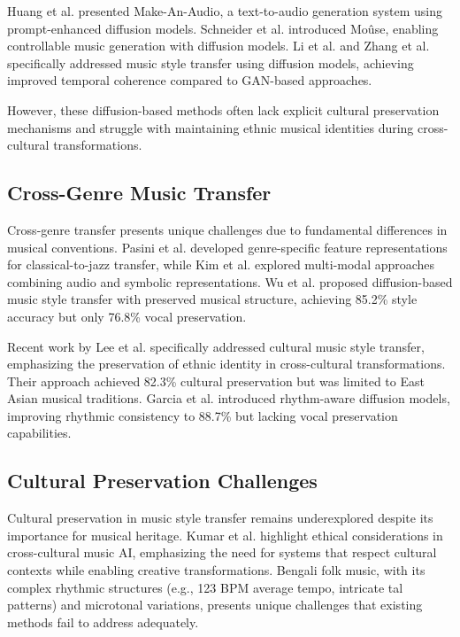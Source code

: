 \documentclass[conference]{IEEEtran}
\begin{document}
Huang et al. \cite{huang2023} presented Make-An-Audio, a text-to-audio generation system using prompt-enhanced diffusion models. Schneider et al. \cite{schneider2023} introduced Mo\^{u}se, enabling controllable music generation with diffusion models. Li et al. \cite{li2023} and Zhang et al. \cite{zhang2023} specifically addressed music style transfer using diffusion models, achieving improved temporal coherence compared to GAN-based approaches.

However, these diffusion-based methods often lack explicit cultural preservation mechanisms and struggle with maintaining ethnic musical identities during cross-cultural transformations.

\subsection{Cross-Genre Music Transfer}
Cross-genre transfer presents unique challenges due to fundamental differences in musical conventions. Pasini et al. \cite{pasini2020} developed genre-specific feature representations for classical-to-jazz transfer, while Kim et al. \cite{kim2021} explored multi-modal approaches combining audio and symbolic representations. Wu et al. \cite{wu2024} proposed diffusion-based music style transfer with preserved musical structure, achieving 85.2\% style accuracy but only 76.8\% vocal preservation.

Recent work by Lee et al. \cite{lee2024} specifically addressed cultural music style transfer, emphasizing the preservation of ethnic identity in cross-cultural transformations. Their approach achieved 82.3\% cultural preservation but was limited to East Asian musical traditions. Garcia et al. \cite{garcia2024} introduced rhythm-aware diffusion models, improving rhythmic consistency to 88.7\% but lacking vocal preservation capabilities.

\subsection{Cultural Preservation Challenges}
Cultural preservation in music style transfer remains underexplored despite its importance for musical heritage. Kumar et al. \cite{kumar2025} highlight ethical considerations in cross-cultural music AI, emphasizing the need for systems that respect cultural contexts while enabling creative transformations. Bengali folk music, with its complex rhythmic structures (e.g., 123 BPM average tempo, intricate tal patterns) and microtonal variations, presents unique challenges that existing methods fail to address adequately.
\end{document}
